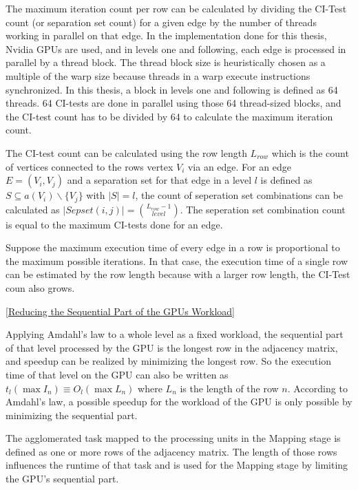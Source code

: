 The maximum iteration count per row can be calculated by dividing the CI-Test count (or separation set count) for a given edge by the number of threads working in parallel on that edge. In the implementation done for this thesis, Nvidia GPUs are used, and in levels one and following, each edge is processed in parallel by a thread block. The thread block size is heuristically chosen as a multiple of the warp size because threads in a warp execute instructions synchronized. In this thesis, a block in levels one and following is defined as 64 threads. 64 CI-tests are done in parallel using those 64 thread-sized blocks, and the CI-test count has to be divided by 64 to calculate the maximum iteration count.

The CI-test count can be calculated using the row length $L_{row}$ which is the count of vertices connected to the rows vertex $V_i$ via an edge. For an edge $E=(V_i,V_j)$ and a separation set for that edge in a level $l$ is defined as $S \subseteq a(V_i ) \backslash \{V_j\}$ with $| S | = l$, the count of seperation set combinations can be calculated as $|Sepset(i,j)| = {L_{row} - 1 \choose level}$. The seperation set combination count is equal to the maximum CI-tests done for an edge.

Suppose the maximum execution time of every edge in a row is proportional to the maximum possible iterations. In that case, the execution time of a single row can be estimated by the row length because with a larger row length, the CI-Test coun also grows.

\ref{Reducing the Sequential Part of the GPUs Workload}

Applying Amdahl's law to a whole level as a fixed workload, the sequential part of that level processed by the GPU is the longest row in the adjacency matrix, and speedup can be realized by minimizing the longest row. So the execution time of that level on the GPU can also be written as $t_{l}(\max I_n) \equiv O_{l}(\max L_n)$ where $L_n$ is the length of the row $n$. According to Amdahl's law, a possible speedup for the workload of the GPU is only possible by minimizing the sequential part.

The agglomerated task mapped to the processing units in the Mapping stage is defined as one or more rows of the adjacency matrix. The length of those rows influences the runtime of that task and is used for the Mapping stage by limiting the GPU's sequential part.

